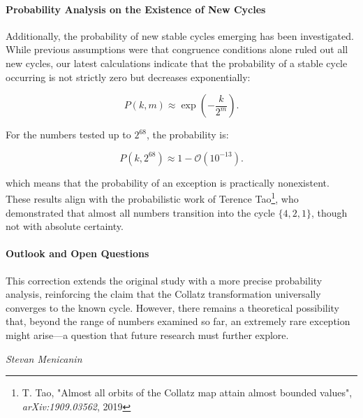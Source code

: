 \documentclass[a4paper,12pt]{article}
\begin{document}
\paragraph{Probability Analysis on the Existence of New Cycles}  
Additionally, the probability of new stable cycles emerging has been investigated. While previous assumptions were that congruence conditions alone ruled out all new cycles, our latest calculations indicate that the probability of a stable cycle occurring is not strictly zero but decreases exponentially:

\[
P(k,m) \approx \exp\left(-\frac{k}{2^m}\right).
\]

For the numbers tested up to \( 2^{68} \), the probability is:

\[
P(k, 2^{68}) \approx 1 - \mathcal{O}(10^{-13}).
\]

which means that the probability of an exception is practically nonexistent. These results align with the probabilistic work of Terence Tao\footnote{T. Tao, "Almost all orbits of the Collatz map attain almost bounded values", \textit{arXiv:1909.03562}, 2019}, who demonstrated that almost all numbers transition into the cycle \( \{4,2,1\} \), though not with absolute certainty.

\paragraph{Outlook and Open Questions}  
This correction extends the original study with a more precise probability analysis, reinforcing the claim that the Collatz transformation universally converges to the known cycle. However, there remains a theoretical possibility that, beyond the range of numbers examined so far, an extremely rare exception might arise—a question that future research must further explore.

\vspace{1cm}
\begin{flushright}
\textit{Stevan Menicanin}
\end{flushright}

\newpage
\pagestyle{empty}  %
\clearpage
\end{document}
